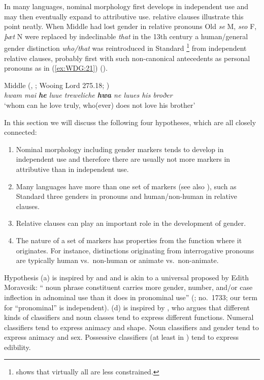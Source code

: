 \documentclass[output=collectionpaper]{langsci/langscibook}
\begin{document}
\largerpage
In many languages, nominal morphology first develops in independent use and may then eventually expand to attributive use.  relative clauses illustrate this point neatly. When Middle  had lost gender in relative pronouns \textendash{} Old  \textit{se} M, \textit{seo} F, \textit{þæt} N were replaced by indeclinable \textit{that} in the 13th century \textendash{} a human/general gender distinction \textit{who/that} was reintroduced in Standard %
\footnote{%
\cite{Herrmann2005} shows that virtually all  are less constrained.
} %
from independent relative clauses, probably first with such non-canonical antecedents as personal pronouns as in (\ref{ex:WDG:21}) (\citealt[91--93]{Fischer2000}).

\ea\label{ex:WDG:21}
Middle  (, ; Wooing Lord 275.18; \citealt{Fischer2000})\\
	\textit{hwam mai \textbf{he} luue treweliche \textbf{hwa} ne luues his broðer}\\
	`whom can he love truly, who(ever) does not love his brother' \\
\z

In this section we will discuss the following four hypotheses, which are all closely connected:

\begin{enumerate}[label=(\alph*)]
\item Nominal morphology \textendash{} including gender markers \textendash{} tends to develop in independent use and therefore there are usually not more markers in attributive than in independent use.
\item Many languages have more than one set of markers (see also \citealt{Dahl2000}), such as Standard  three genders in pronouns and human/non-human in relative clauses.
\item Relative clauses can play an important role in the development of gender.
\item The nature of a set of markers has properties from the function where it originates. For instance, distinctions originating from interrogative pronouns are typically human vs.\ non-human or animate vs.\ non-animate.
\end{enumerate}

Hypothesis (a) is inspired by \cite{Lehmann1982} and \cite[233; based on ]{Heine1984} and is akin to a universal proposed by Edith Moravcsik: `` noun phrase constituent carries more gender, number, and/or case inflection in adnominal use than it does in pronominal use'' (\citealt{Moravcsik1994}; \citeauthor{UniArchive} no.~1733; our term for ``pronominal'' is independent). (d) is inspired by \cite{Croft1994}, who argues that different kinds of classifiers and noun classes tend to express different functions. Numeral classifiers tend to express animacy and shape. Noun classifiers and gender tend to express animacy and sex. Possessive classifiers (at least in ) tend to express edibility.
\end{document}
